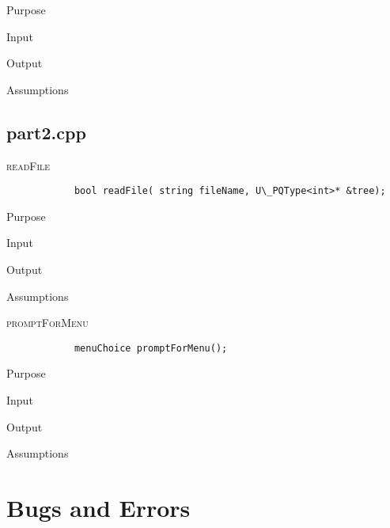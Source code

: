 \documentclass[pdftex, 12pt]{article}
\begin{document}
\begin{description}
\begin{description}
			\item{Purpose}

			\item{Input}

			\item{Output}

			\item{Assumptions}

		\end{description}
\end{description}
\subsection{part2.cpp}
\begin{description}
	\item{\textsc{readFile}}
		\begin{lstlisting}
			bool readFile( string fileName, U\_PQType<int>* &tree);
		\end{lstlisting}
		\begin{description}

			\item{Purpose}

			\item{Input}

			\item{Output}

			\item{Assumptions}

		\end{description}
	\item{\textsc{promptForMenu}}
		\begin{lstlisting}
			menuChoice promptForMenu();
		\end{lstlisting}
		\begin{description}

			\item{Purpose}

			\item{Input}

			\item{Output}

			\item{Assumptions}

		\end{description}

\end{description}
\section{Bugs and Errors}
\end{document}
